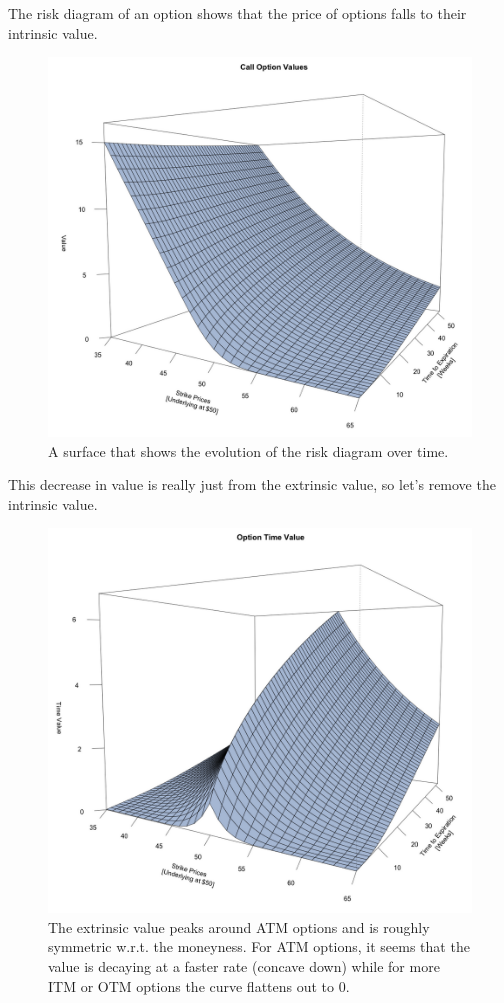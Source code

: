 \documentclass{article}
\begin{document}
    The risk diagram of an option shows that the price of options falls to their intrinsic value. 

    \begin{figure}[H]
      \centering 
      \includegraphics[scale=0.4]{img/theta1.png}
      \caption{A surface that shows the evolution of the risk diagram over time. } 
      \label{fig:theta1}
    \end{figure}

    This decrease in value is really just from the extrinsic value, so let's remove the intrinsic value. 

    \begin{figure}[H]
      \centering 
      \includegraphics[scale=0.4]{img/theta2.png}
      \caption{The extrinsic value peaks around ATM options and is roughly symmetric w.r.t. the moneyness. For ATM options, it seems that the value is decaying at a faster rate (concave down) while for more ITM or OTM options the curve flattens out to $0$. } 
      \label{fig:theta2}
    \end{figure}
\end{document}
